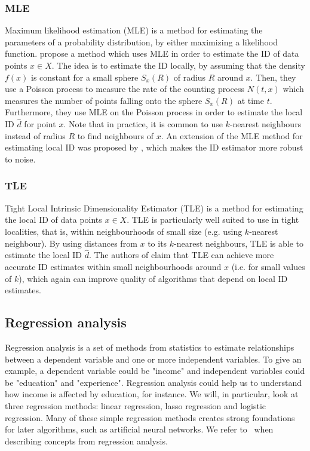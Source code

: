 \subsubsection{MLE}
\label{sec:id-estimation-mle}
Maximum likelihood estimation (MLE) is a method for estimating the parameters of a probability distribution, by either maximizing a likelihood function. \cite{Levina2004} propose a method which uses MLE in order to estimate the ID of data points $x \in X$. The idea is to estimate the ID locally, by assuming that the density $f(x)$ is constant for a small sphere $S_x(R)$ of radius $R$ around $x$. Then, they use a Poisson process to measure the rate of the counting process $N(t, x)$ which measures the number of points falling onto the sphere $S_x(R)$ at time $t$. Furthermore, they use MLE on the Poisson process in order to estimate the local ID $\hat{d}$ for point $x$. Note that in practice, it is common to use $k$-nearest neighbours instead of radius $R$ to find neighbours of $x$. An extension of the MLE method for estimating local ID was proposed by \cite{Haro2008}, which makes the ID estimator more robust to noise.

\subsubsection{TLE}
\label{sec:id-estimation-tle}
Tight Local Intrinsic Dimensionality Estimator (TLE) \cite{Amsaleg2019} is a method for estimating the local ID of data points $x \in X$. TLE is particularly well suited to use in tight localities, that is, within neighbourhoods of small size (e.g. using $k$-nearest neighbour). By using distances from $x$ to its $k$-nearest neighbours, TLE is able to estimate the local ID $\hat{d}$. The authors of \cite{Amsaleg2019} claim that TLE can achieve more accurate ID estimates within small neighbourhoods around $x$ (i.e. for small values of $k$), which again can improve quality of algorithms that depend on local ID estimates.

\subsection{Regression analysis}
\label{sec:regression-analysis}
Regression analysis is a set of methods from statistics to estimate relationships between a dependent variable and one or more independent variables. To give an example, a dependent variable could be "income" and independent variables could be "education" and "experience". Regression analysis could help us to understand how income is affected by education, for instance. We will, in particular, look at three regression methods: linear regression, lasso regression and logistic regression. Many of these simple regression methods creates strong foundations for later algorithms, such as artificial neural networks. We refer to \cites{James2013}{fox2015applied} \, when describing concepts from regression analysis.

